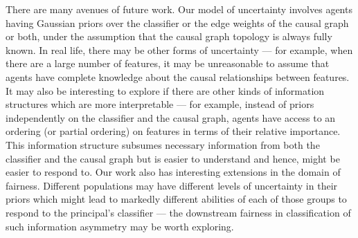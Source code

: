 There are many avenues of future work. Our model of uncertainty involves agents having Gaussian priors over the classifier or the edge weights of the causal graph or both, under the assumption that the causal graph topology is always fully known. In real life, there may be other forms of uncertainty --- for example, when there are a large number of features, it may be unreasonable to assume that agents have complete knowledge about the causal relationships between features. It may also be interesting to explore if there are other kinds of information structures which are more interpretable --- for example, instead of priors independently on the classifier and the causal graph, agents have access to an ordering (or partial ordering) on features in terms of their relative importance. This information structure subsumes necessary information from both the classifier and the causal graph but is easier to understand and hence, might be easier to respond to. Our work also has interesting extensions in the domain of fairness. Different populations may have different levels of uncertainty in their priors which might lead to markedly different abilities of each of those groups to respond to the principal's classifier --- the downstream fairness in classification of such information asymmetry may be worth exploring.  
